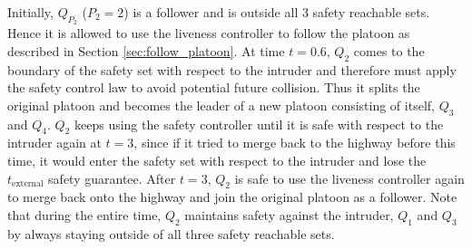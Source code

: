 Initially, $Q_{P_2}$ ($P_2=2$) is a follower and is outside all 3 safety reachable sets. Hence it is allowed to use the liveness controller to follow the platoon as described in Section \ref{sec:follow_platoon}. At time $t=0.6$, $Q_2$ comes to the boundary of the safety set with respect to the intruder and therefore must apply the safety control law to avoid potential future collision. Thus it splits the original platoon and becomes the leader of a new platoon consisting of itself, $Q_3$ and $Q_4$. $Q_2$ keeps using the safety controller until it is safe with respect to the intruder again at $t=3$, since if it tried to merge back to the highway before this time, it would enter the safety set with respect to the intruder and lose the $t_\text{external}$ safety guarantee. After $t=3$, $Q_2$ is safe to use the liveness controller again to merge back onto the highway and join the original platoon as a follower. Note that during the entire time, $Q_2$ maintains safety against the intruder, $Q_1$ and $Q_3$ by always staying outside of all three safety reachable sets.

